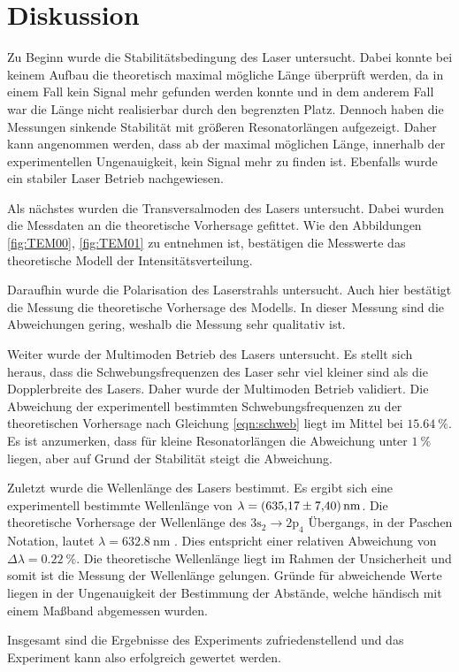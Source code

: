 \chapter{Diskussion}
\label{cha:Diskussion}
Zu Beginn wurde die Stabilitätsbedingung des Laser untersucht. Dabei konnte bei keinem Aufbau die theoretisch maximal mögliche Länge überprüft werden, da in einem Fall kein Signal mehr
gefunden werden konnte und in dem anderem Fall war die Länge nicht realisierbar durch den begrenzten Platz. Dennoch haben die Messungen sinkende Stabilität mit größeren 
Resonatorlängen aufgezeigt. Daher kann angenommen werden, dass ab der maximal möglichen Länge, innerhalb der experimentellen Ungenauigkeit, kein Signal mehr zu finden ist. 
Ebenfalls wurde ein stabiler Laser Betrieb nachgewiesen. 

Als nächstes wurden die Transversalmoden des Lasers untersucht. Dabei wurden die Messdaten an die theoretische Vorhersage gefittet. Wie den Abbildungen \ref{fig:TEM00}, \ref{fig:TEM01}
zu entnehmen ist, bestätigen die Messwerte das theoretische Modell der Intensitätsverteilung.

Daraufhin wurde die Polarisation des Laserstrahls untersucht. Auch hier bestätigt die Messung die theoretische Vorhersage des Modells. In dieser Messung sind die Abweichungen gering, 
weshalb die Messung sehr qualitativ ist.

Weiter wurde der Multimoden Betrieb des Lasers untersucht. Es stellt sich heraus, dass die Schwebungsfrequenzen des Laser sehr viel kleiner sind als die Dopplerbreite des Lasers. 
Daher wurde der Multimoden Betrieb validiert. Die Abweichung der experimentell bestimmten Schwebungsfrequenzen zu der theoretischen Vorhersage nach Gleichung \ref{eqn:schweb} liegt im 
Mittel bei $\qty{15.64}{\percent}$. Es ist anzumerken, dass für kleine Resonatorlängen die Abweichung unter $\qty{1}{\percent}$ liegen, aber auf Grund der Stabilität steigt die Abweichung.  

Zuletzt wurde die Wellenlänge des Lasers bestimmt. Es ergibt sich eine experimentell bestimmte Wellenlänge von $\lambda = \qty{635.17 +- 7.40}{\nano\metre}$. Die theoretische 
Vorhersage der Wellenlänge des $3\text{s}_2 \rightarrow 2\text{p}_4$ Übergangs, in der Paschen Notation, lautet $\lambda = \qty{632.8}{\nano\metre}$ \cite{Wikipedia_HeNe}.
Dies entspricht einer relativen Abweichung von $\Delta \lambda = \qty{0.22}{\percent}$. Die theoretische Wellenlänge liegt im Rahmen der Unsicherheit und somit ist die Messung 
der Wellenlänge gelungen. Gründe für abweichende Werte liegen in der Ungenauigkeit der Bestimmung der Abstände, welche händisch mit einem Maßband abgemessen wurden. 

Insgesamt sind die Ergebnisse des Experiments zufriedenstellend und das Experiment kann also erfolgreich gewertet werden.